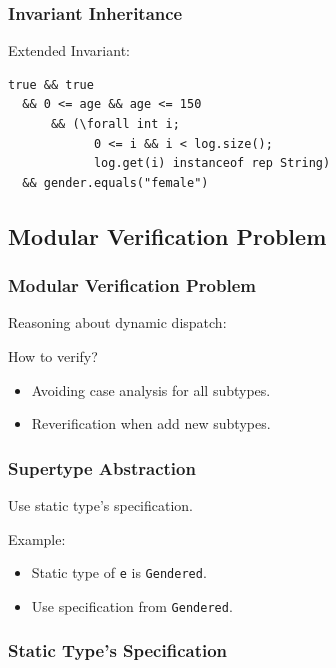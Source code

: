 \begin{frame}[fragile]
\frametitle{Invariant Inheritance}


Extended Invariant:

\begin{lstlisting}[mathescape=true]
  true && true
  && 0 <= age && age <= 150
      && (\forall int i;
            0 <= i && i < log.size();
            log.get(i) instanceof rep String)
  && gender.equals("female")
\end{lstlisting}
\end{frame}

\subsection[Modularity]{Modular Verification Problem}

\begin{frame}[fragile]
\frametitle{Modular Verification Problem}

Reasoning about dynamic dispatch:



How to verify?
\begin{itemize}
\item
Avoiding case analysis for all subtypes.

\item
Reverification when add new subtypes.
\end{itemize}
\end{frame}

\begin{frame}[fragile]
\frametitle{Supertype Abstraction}

Use static type's specification.

Example:



\begin{itemize}
\item
Static type of \lstinline!e! is \lstinline!Gendered!.

\item
Use specification from \lstinline!Gendered!.
\end{itemize}
\end{frame}

\begin{frame}[fragile]
\frametitle{Static Type's Specification}


\end{frame}

